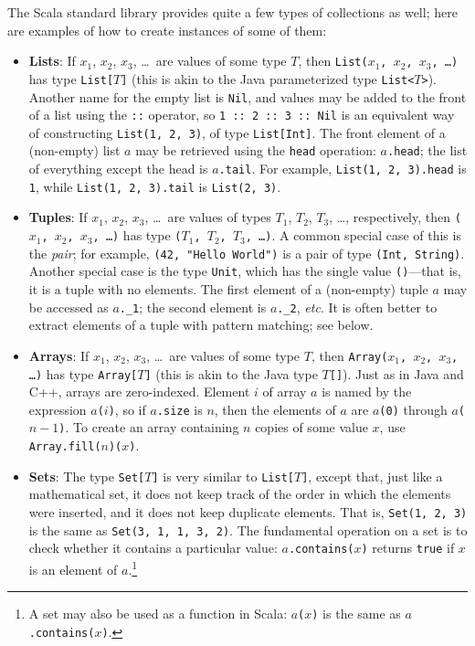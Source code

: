 \documentclass[11pt]{article}
\begin{document}
The Scala standard library provides quite a few types of collections as well; here are examples of how to create instances of some of them:
\begin{itemize}
\item \textbf{Lists}: If $x_1$, $x_2$, $x_3$, \ldots\ are values of some type $T$, then \texttt{List($x_1$, $x_2$, $x_3$, \ldots)} has type \texttt{List[$T$]} (this is akin to the Java parameterized type \texttt{List<$T$>}). Another name for the empty list is \texttt{Nil}, and values may be added to the front of a list using the \texttt{::} operator, so \verb|1 :: 2 :: 3 :: Nil| is an equivalent way of constructing \texttt{List(1, 2, 3)}, of type \texttt{List[Int]}. The front element of a (non-empty) list $a$ may be retrieved using the \texttt{head} operation: \texttt{$a$.head}; the list of everything except the head is \texttt{$a$.tail}. For example, \texttt{List(1, 2, 3).head} is \texttt{1}, while \texttt{List(1, 2, 3).tail} is \texttt{List(2, 3)}.

\item \textbf{Tuples}: If $x_1$, $x_2$, $x_3$, \ldots\ are values of types $T_1$, $T_2$, $T_3$, \ldots, respectively, then \texttt{($x_1$, $x_2$, $x_3$, \ldots)} has type \texttt{($T_1$, $T_2$, $T_3$, \ldots)}. A common special case of this is the \emph{pair}; for example, \texttt{(42, "Hello World")} is a pair of type \texttt{(Int, String)}. Another special case is the type \texttt{Unit}, which has the single value \texttt{()}---that is, it is a tuple with no elements. The first element of a (non-empty) tuple $a$ may be accessed as $a$\verb|._1|; the second element is $a$\verb|._2|, \textit{etc}. It is often better to extract elements of a tuple with pattern matching; see below.

\item \textbf{Arrays}:  If $x_1$, $x_2$, $x_3$, \ldots\ are values of some type $T$, then \texttt{Array($x_1$, $x_2$, $x_3$, \ldots)} has type \texttt{Array[$T$]} (this is akin to the Java type \texttt{$T$[]}). Just as in Java and C++, arrays are zero-indexed. Element $i$ of array $a$ is named by the expression \texttt{$a$($i$)}, so if \texttt{$a$.size} is $n$, then the elements of $a$ are \texttt{$a$(0)} through \texttt{$a$($n-1$)}. To create an array containing $n$ copies of some value $x$, use \texttt{Array.fill($n$)($x$)}.

\item \textbf{Sets}: The type \texttt{Set[$T$]} is very similar to \texttt{List[$T$]}, except that, just like a mathematical set, it does not keep track of the order in which the elements were inserted, and it does not keep duplicate elements. That is, \texttt{Set(1, 2, 3)} is the same as \texttt{Set(3, 1, 1, 3, 2)}. The fundamental operation on a set is to check whether it contains a particular value: \texttt{$a$.contains($x$)} returns \texttt{true} if $x$ is an element of $a$.\footnote{A set may also be used as a function in Scala: \texttt{$a$($x$)} is the same as \texttt{$a$.contains($x$)}.}


\end{itemize}
\end{document}
